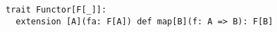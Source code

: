 \begin{algorithm}

\begin{verbatim}
trait Functor[F[_]]:
  extension [A](fa: F[A]) def map[B](f: A => B): F[B]
\end{verbatim}

\caption{Functor type class in Scala 3. %
\label{functor:scala}}
\end{algorithm}
